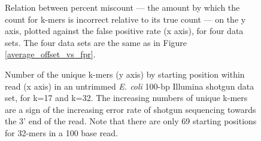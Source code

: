 \documentclass{article}
\begin{document}
\begin{figure}
\caption{Relation between percent miscount --- the amount by which
the count for k-mers is incorrect relative to its true count --- on the y axis, plotted against
the false positive rate (x axis), for four data sets.  The four data
sets are the same as in Figure \ref{average_offset_vs_fpr}.}
\label{percent_offset_vs_fpr}
\end{figure}

\begin{figure}
\caption{Number of the unique k-mers (y axis) by starting position within read (x axis) in an untrimmed {\em E. coli} 100-bp Illumina shotgun data set, for k=17 and k=32.  The increasing numbers of unique k-mers are a sign of the increasing error rate of shotgun sequencing towards the 3' end of the read.  Note that there are only 69 starting positions for 32-mers in a 100 base read.}
\label{perc_unique_pos}
\end{figure}
\end{document}
